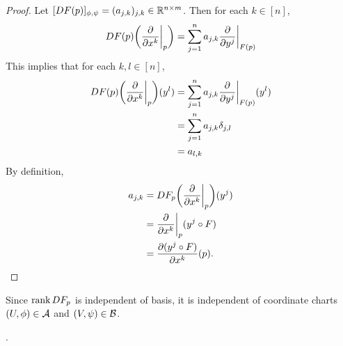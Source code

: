 \documentclass{book}
\begin{document}
	\begin{proof}
		Let $[DF(p)]_{\phi, \psi} = (a_{j,k})_{j,k} \in \mathbb{R}^{n \times m}$. Then for each $k \in [n]$, $$DF(p) \bigg(\frac{\partial }{\partial x^k} \bigg|_p\bigg) = \sum_{j=1}^n a_{j,k}\frac{\partial }{\partial y^j} \bigg|_{F(p)}$$
		This implies that for each $k, l \in [n]$,
		\begin{align*}
			DF(p) \bigg(\frac{\partial }{\partial x^k} \bigg|_p \bigg) (y^l )
			& =  \sum_{j=1}^n a_{j,k}\frac{\partial }{\partial y^j} \bigg|_{F(p)} (y^l) \\
			& = \sum_{j=1}^n a_{j,k} \delta_{j,l} \\
			& = a_{l, k}
		\end{align*}
		By definition, 
		\begin{align*}
			a_{j,k}
			& = DF_p \bigg(\frac{\partial }{\partial x^k} \bigg|_p\bigg) (y^j) \\
			& =  \frac{\partial }{\partial x^k} \bigg|_p (y^j \circ F) \\
			& = \frac{\partial (y^j \circ F)}{\partial x^k} (p).
		\end{align*}
	\end{proof}
	
	
	\begin{note}
	Since $\operatorname{\text{rank}} DF_p$ is independent of basis, it is independent of coordinate charts $(U, \phi) \in \mathcal{A}$ and $(V, \psi) \in \mathcal{B}$. 
	\end{note}	

	\begin{ex}
		.
	\end{ex}
	
	
	
	
	
	
	
	
	
	
	
	
	
	
	
	
	
	
	
	
	
	
	
	
	
	
	
	
	
	
	
	
	
	
	
	
	
	
	
	
	
	
	
	
	
\end{document}
